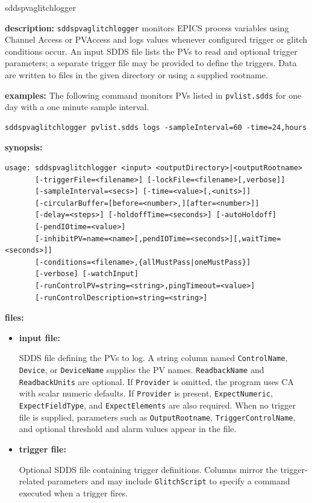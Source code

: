 \begin{sddsprog}{sddspvaglitchlogger}
\item \textbf{description:}
\verb+sddspvaglitchlogger+ monitors EPICS process variables using Channel
Access or PVAccess and
logs values whenever configured trigger or glitch conditions occur.  An input
SDDS file lists the PVs to read and optional trigger parameters; a separate
trigger file may be provided to define the triggers.  Data are written to
files in the given directory or using a supplied rootname.

\item \textbf{examples:}
The following command monitors PVs listed in \verb+pvlist.sdds+ for one day
with a one minute sample interval.
\begin{verbatim}
sddspvaglitchlogger pvlist.sdds logs -sampleInterval=60 -time=24,hours
\end{verbatim}

\item \textbf{synopsis:}
\begin{verbatim}
usage: sddspvaglitchlogger <input> <outputDirectory>|<outputRootname>
       [-triggerFile=<filename>] [-lockFile=<filename>[,verbose]]
       [-sampleInterval=<secs>] [-time=<value>[,<units>]]
       [-circularBuffer=[before=<number>,][after=<number>]]
       [-delay=<steps>] [-holdoffTime=<seconds>] [-autoHoldoff]
       [-pendIOtime=<value>]
       [-inhibitPV=name=<name>[,pendIOTime=<seconds>][,waitTime=<seconds>]]
       [-conditions=<filename>,{allMustPass|oneMustPass}]
       [-verbose] [-watchInput]
       [-runControlPV=string=<string>,pingTimeout=<value>]
       [-runControlDescription=string=<string>]
\end{verbatim}

\item \textbf{files:}
\begin{itemize}
  \item \textbf{input file:}\par
    SDDS file defining the PVs to log. A string column named
    {\tt ControlName}, {\tt Device}, or {\tt DeviceName} supplies the PV names.
    {\tt ReadbackName} and {\tt ReadbackUnits} are optional. If {\tt Provider}
    is omitted, the program uses CA with scalar numeric defaults. If
    {\tt Provider} is present, {\tt ExpectNumeric}, {\tt ExpectFieldType}, and
    {\tt ExpectElements} are also required. When no trigger file is supplied,
    parameters such as
    {\tt OutputRootname}, {\tt TriggerControlName}, and optional threshold and
    alarm values appear in the file.
  \item \textbf{trigger file:}\par
    Optional SDDS file containing trigger definitions. Columns mirror the
    trigger-related parameters and may include {\tt GlitchScript} to specify a
    command executed when a trigger fires.
\end{itemize}


\end{sddsprog}
